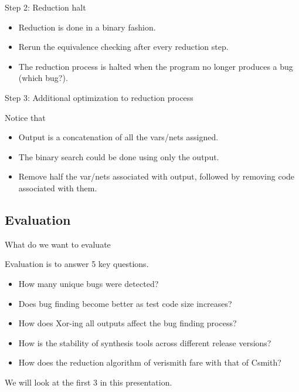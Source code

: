 \documentclass[notes, xcolor=dvipsnames]{beamer}
\begin{document}
    \begin{frame}{Step 2: Reduction halt}

        \begin{itemize}
            \item Reduction is done in a binary fashion. 
            \item Rerun the equivalence checking after every reduction step.
            \item The reduction process is halted when the program no longer produces a bug (which bug?).
        \end{itemize}
        
    \end{frame}

    \begin{frame}{Step 3: Additional optimization to reduction process}

        Notice that
        \begin{itemize}
            \item Output is a concatenation of all the vars/nets assigned. 
            \item The binary search could be done using only the output. 
            \item Remove half the var/nets associated with output, followed by removing code associated with them. 
        \end{itemize}
        
    \end{frame}


    \subsection{Evaluation}
    \begin{frame}{What do we want to evaluate}
        
        Evaluation is to answer 5 key questions.
        \begin{itemize}
            \item How many unique bugs were detected?
            \item Does bug finding become better as test code size increases?
            \item How does Xor-ing all outputs affect the bug finding process?
            \item How is the stability of synthesis tools across different release versions? 
            \item How does the reduction algorithm of verismith fare with that of Csmith?
        \end{itemize}

        We will look at the first 3 in this presentation.

    \end{frame}
\end{document}
